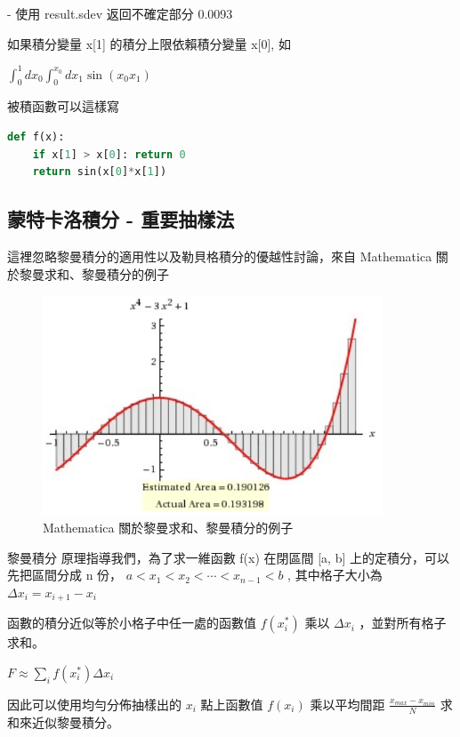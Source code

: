 \documentclass[10pt,UTF8]{ctexart}
\begin{document}
- 使用 result.sdev 返回不確定部分 0.0093

如果積分變量 x[1] 的積分上限依賴積分變量 x[0], 如

$\int_{0}^{1} d x_{0} \int_{0}^{x_{0}} d x_{1} \sin(x_{0}x_{1})$

被積函數可以這樣寫

\begin{lstlisting}[language={python}]
def f(x):
    if x[1] > x[0]: return 0
    return sin(x[0]*x[1])
\end{lstlisting}


\subsection{蒙特卡洛積分 - 重要抽樣法}

這裡忽略黎曼積分的適用性以及勒貝格積分的優越性討論，來自 Mathematica 關於黎曼求和、黎曼積分的例子

\begin{figure}[H]
\centering 
\includegraphics[width=0.90\textwidth]{w15-lab-8.png} 
\caption{Mathematica 關於黎曼求和、黎曼積分的例子}
\label{Test}
\end{figure}

黎曼積分 原理指導我們，為了求一維函數 f(x) 在閉區間 [a, b] 上的定積分，可以先把區間分成 n 份， $a<x_{1}<x_{2}<\cdots<x_{n-1}<b$  , 其中格子大小為 $\Delta x_{i}=x_{i+1}-x_{i}$

函數的積分近似等於小格子中任一處的函數值 $f\left(x_{i}^{*}\right)$ 乘以 $\Delta x_{i}$ ，並對所有格子求和。

$F \approx \sum_{i} f\left(x_{i}^{*}\right) \Delta x_{i}$

因此可以使用均勻分佈抽樣出的 $x_{i}$ 點上函數值 $f(x_{i})$ 乘以平均間距 $\frac{x_{max}-x_{min}}{N}$ 求和來近似黎曼積分。
\end{document}
